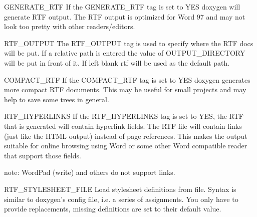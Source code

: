 \begin{DoxyDescription}
\item[{\ttfamily GENERATE\_\-RTF} ] If the {\ttfamily GENERATE\_\-RTF} tag is set to {\ttfamily YES} doxygen will generate RTF output. The RTF output is optimized for Word 97 and may not look too pretty with other readers/editors.

\label{config_cfg_rtf_output}
\hypertarget{config_cfg_rtf_output}{}
 
\item[{\ttfamily RTF\_\-OUTPUT} ] The {\ttfamily RTF\_\-OUTPUT} tag is used to specify where the RTF docs will be put. If a relative path is entered the value of {\ttfamily OUTPUT\_\-DIRECTORY} will be put in front of it. If left blank {\ttfamily rtf} will be used as the default path.

\label{config_cfg_compact_rtf}
\hypertarget{config_cfg_compact_rtf}{}
 
\item[{\ttfamily COMPACT\_\-RTF} ] If the {\ttfamily COMPACT\_\-RTF} tag is set to {\ttfamily YES} doxygen generates more compact RTF documents. This may be useful for small projects and may help to save some trees in general.

\label{config_cfg_rtf_hyperlinks}
\hypertarget{config_cfg_rtf_hyperlinks}{}
 
\item[{\ttfamily RTF\_\-HYPERLINKS} ] If the {\ttfamily RTF\_\-HYPERLINKS} tag is set to {\ttfamily YES}, the RTF that is generated will contain hyperlink fields. The RTF file will contain links (just like the HTML output) instead of page references. This makes the output suitable for online browsing using Word or some other Word compatible reader that support those fields.

\begin{DoxyParagraph}{note:}
WordPad (write) and others do not support links.
\end{DoxyParagraph}
\label{config_cfg_rtf_stylesheet_file}
\hypertarget{config_cfg_rtf_stylesheet_file}{}
 
\item[{\ttfamily RTF\_\-STYLESHEET\_\-FILE} ] Load stylesheet definitions from file. Syntax is similar to doxygen's config file, i.e. a series of assignments. You only have to provide replacements, missing definitions are set to their default value.


\end{DoxyDescription}
